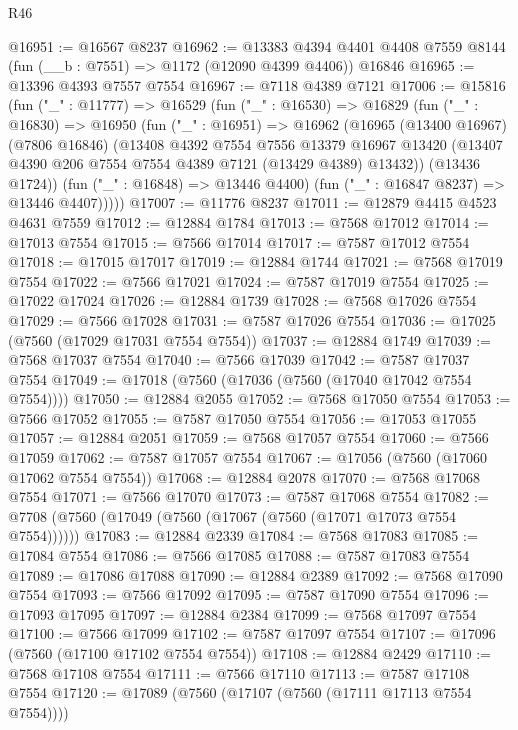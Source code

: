 \begin{lexlean}{R46}
\begin{coremodule}
@16951 := @16567 @8237
@16962 := @13383
    @4394
    @4401
    @4408
    @7559
    @8144
    (fun (__b : @7551) => @1172 (@12090 @4399 @4406))
    @16846
@16965 := @13396 @4393 @7557 @7554
@16967 := @7118 @4389 @7121
@17006 := @15816
    (fun ("_" : @11777) =>
    @16529
      (fun ("_" : @16530) =>
      @16829
        (fun ("_" : @16830) =>
        @16950
          (fun ("_" : @16951) =>
          @16962
            (@16965
              (@13400 @16967)
              (@7806 @16846)
              (@13408
                @4392
                @7554
                @7556
                @13379
                @16967
                @13420
                (@13407 @4390 @206 @7554 @7554 @4389 @7121 (@13429 @4389) @13432))
              (@13436 @1724))
            (fun ("_" : @16848) => @13446 @4400)
            (fun ("_" : @16847 @8237) => @13446 @4407)))))
@17007 := @11776 @8237
@17011 := @12879 @4415 @4523 @4631 @7559
@17012 := @12884 @1784
@17013 := @7568 @17012
@17014 := @17013 @7554
@17015 := @7566 @17014
@17017 := @7587 @17012 @7554
@17018 := @17015 @17017
@17019 := @12884 @1744
@17021 := @7568 @17019 @7554
@17022 := @7566 @17021
@17024 := @7587 @17019 @7554
@17025 := @17022 @17024
@17026 := @12884 @1739
@17028 := @7568 @17026 @7554
@17029 := @7566 @17028
@17031 := @7587 @17026 @7554
@17036 := @17025 (@7560 (@17029 @17031 @7554 @7554))
@17037 := @12884 @1749
@17039 := @7568 @17037 @7554
@17040 := @7566 @17039
@17042 := @7587 @17037 @7554
@17049 := @17018 (@7560 (@17036 (@7560 (@17040 @17042 @7554 @7554))))
@17050 := @12884 @2055
@17052 := @7568 @17050 @7554
@17053 := @7566 @17052
@17055 := @7587 @17050 @7554
@17056 := @17053 @17055
@17057 := @12884 @2051
@17059 := @7568 @17057 @7554
@17060 := @7566 @17059
@17062 := @7587 @17057 @7554
@17067 := @17056 (@7560 (@17060 @17062 @7554 @7554))
@17068 := @12884 @2078
@17070 := @7568 @17068 @7554
@17071 := @7566 @17070
@17073 := @7587 @17068 @7554
@17082 := @7708 (@7560 (@17049 (@7560 (@17067 (@7560 (@17071 @17073 @7554 @7554))))))
@17083 := @12884 @2339
@17084 := @7568 @17083
@17085 := @17084 @7554
@17086 := @7566 @17085
@17088 := @7587 @17083 @7554
@17089 := @17086 @17088
@17090 := @12884 @2389
@17092 := @7568 @17090 @7554
@17093 := @7566 @17092
@17095 := @7587 @17090 @7554
@17096 := @17093 @17095
@17097 := @12884 @2384
@17099 := @7568 @17097 @7554
@17100 := @7566 @17099
@17102 := @7587 @17097 @7554
@17107 := @17096 (@7560 (@17100 @17102 @7554 @7554))
@17108 := @12884 @2429
@17110 := @7568 @17108 @7554
@17111 := @7566 @17110
@17113 := @7587 @17108 @7554
@17120 := @17089 (@7560 (@17107 (@7560 (@17111 @17113 @7554 @7554))))

\end{coremodule}
\end{lexlean}
